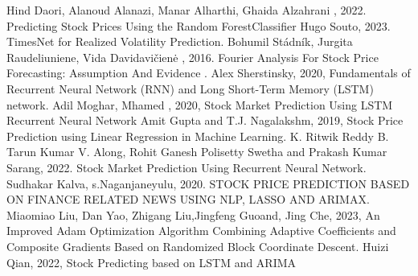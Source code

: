 \documentclass{ieeeojies}
\begin{document}
\begin{thebibliography}{00}
 Hind Daori, Alanoud Alanazi, Manar Alharthi, Ghaida Alzahrani
 ,  2022. Predicting Stock Prices Using the Random ForestClassifier
 Hugo Souto, 2023. TimesNet for Realized Volatility Prediction.
 Bohumil Stádník, Jurgita Raudeliuniene, Vida Davidavičienė , 2016. Fourier Analysis For Stock Price Forecasting: Assumption And Evidence .
 Alex Sherstinsky, 2020, Fundamentals of Recurrent Neural Network (RNN) and Long Short-Term Memory (LSTM) network.
 Adil Moghar, Mhamed , 2020, Stock Market Prediction Using LSTM Recurrent Neural Network 
 Amit Gupta and T.J. Nagalakshm, 2019, Stock Price Prediction using Linear Regression in Machine Learning.
 K. Ritwik Reddy B. Tarun Kumar V. Along, Rohit Ganesh Polisetty Swetha and Prakash Kumar Sarang, 2022. Stock Market Prediction Using Recurrent Neural Network.
 Sudhakar Kalva, s.Naganjaneyulu, 2020. STOCK PRICE PREDICTION BASED ON FINANCE RELATED NEWS USING NLP, LASSO AND ARIMAX.
 Miaomiao Liu, Dan Yao, Zhigang Liu,Jingfeng Guoand, Jing Che, 2023, An Improved Adam Optimization Algorithm Combining Adaptive Coefficients and Composite Gradients Based on Randomized Block Coordinate Descent.
 Huizi Qian, 2022, Stock Predicting based on LSTM and ARIMA


\end{thebibliography}


\EOD
\end{document}
